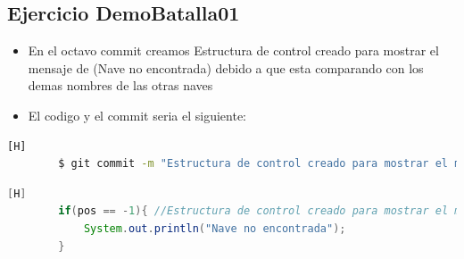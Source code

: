 \documentclass{article}
\begin{document}
	\subsection{Ejercicio DemoBatalla01}
	\begin{itemize}	
		\item En el octavo commit creamos Estructura de control creado para mostrar el mensaje de (Nave no encontrada) debido a que esta comparando con los demas nombres de las otras naves
		\item El codigo y el commit seria el siguiente:
	\end{itemize}
	\begin{lstlisting}[language=bash,caption={Commit}][H]
		$ git commit -m "Estructura de control creado para mostrar el mensaje de (Nave no encontrada) debido a que esta comparando con los demas nombres de las otras naves"
	\end{lstlisting}
	\begin{lstlisting}[language=java,caption={Las lineas de codigo de lo creado:}][H]
        if(pos == -1){ //Estructura de control creado para mostrar el mensaje de "Nave no encontrada" debido a que esta comparando con los demas nombres de las otras naves
            System.out.println("Nave no encontrada");
        }
	\end{lstlisting}
\end{document}
